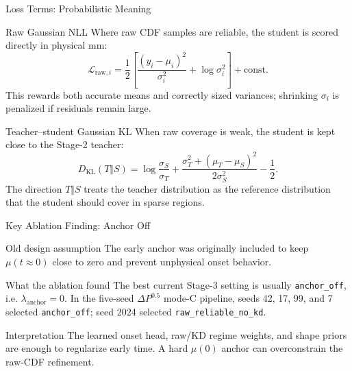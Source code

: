 \documentclass[UTF8,aspectratio=169]{ctexbeamer}
\begin{document}
\begin{frame}{Loss Terms: Probabilistic Meaning}
\small
\begin{block}{Raw Gaussian NLL}
\footnotesize
Where raw CDF samples are reliable, the student is scored directly in physical mm:
\[
\mathcal{L}_{\mathrm{raw},i}
=\frac{1}{2}\left[
\frac{(y_i-\mu_i)^2}{\sigma_i^2}
+\log\sigma_i^2
\right] + \mathrm{const.}
\]
This rewards both accurate means and correctly sized variances; shrinking
\(\sigma_i\) is penalized if residuals remain large.
\end{block}

\begin{block}{Teacher--student Gaussian KL}
\footnotesize
When raw coverage is weak, the student is kept close to the Stage-2 teacher:
\[
D_{\mathrm{KL}}(T\Vert S)
=\log\frac{\sigma_S}{\sigma_T}
+\frac{\sigma_T^2+(\mu_T-\mu_S)^2}{2\sigma_S^2}
-\frac{1}{2}.
\]
The direction \(T\Vert S\) treats the teacher distribution as the reference
distribution that the student should cover in sparse regions.
\end{block}
\end{frame}

\begin{frame}{Key Ablation Finding: Anchor Off}
\small
\begin{block}{Old design assumption}
The early anchor was originally included to keep \(\mu(t\approx0)\) close to zero and prevent unphysical onset behavior.
\end{block}

\begin{block}{What the ablation found}
The best current Stage-3 setting is usually \texttt{anchor\_off}, i.e. \(\lambda_{\mathrm{anchor}}=0\). In the five-seed \(\Delta P^{0.5}\) mode-C pipeline, seeds 42, 17, 99, and 7 selected \texttt{anchor\_off}; seed 2024 selected \texttt{raw\_reliable\_no\_kd}.
\end{block}

\begin{block}{Interpretation}
The learned onset head, raw/KD regime weights, and shape priors are enough to regularize early time. A hard \(\mu(0)\) anchor can overconstrain the raw-CDF refinement.
\end{block}
\end{frame}
\end{document}
